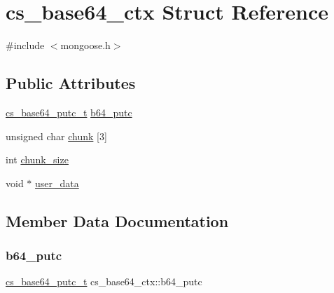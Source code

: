 \hypertarget{structcs__base64__ctx}{}\section{cs\+\_\+base64\+\_\+ctx Struct Reference}
\label{structcs__base64__ctx}


{\ttfamily \#include $<$mongoose.\+h$>$}

\subsection*{Public Attributes}
\begin{DoxyCompactItemize}
\item 
\hyperlink{mongoose_8h_ab2260ef7657f28e31f29dcc1313f1e8d_ab2260ef7657f28e31f29dcc1313f1e8d}{cs\+\_\+base64\+\_\+putc\+\_\+t} \hyperlink{structcs__base64__ctx_a59b8384fbdd1681555a9dd18ed6585ae_a59b8384fbdd1681555a9dd18ed6585ae}{b64\+\_\+putc}
\item 
unsigned char \hyperlink{structcs__base64__ctx_a209b5eff716d6a1850cca128ed5b070e_a209b5eff716d6a1850cca128ed5b070e}{chunk} \mbox{[}3\mbox{]}
\item 
int \hyperlink{structcs__base64__ctx_a5753baf57fe83161369e2270d57e4a9e_a5753baf57fe83161369e2270d57e4a9e}{chunk\+\_\+size}
\item 
void $\ast$ \hyperlink{structcs__base64__ctx_ac6023cc2887001835a99b6a71db9f43b_ac6023cc2887001835a99b6a71db9f43b}{user\+\_\+data}
\end{DoxyCompactItemize}


\subsection{Member Data Documentation}
\mbox{\label{structcs__base64__ctx_a59b8384fbdd1681555a9dd18ed6585ae_a59b8384fbdd1681555a9dd18ed6585ae}} 
\subsubsection{\texorpdfstring{b64\+\_\+putc}{b64\_putc}}
{\footnotesize\ttfamily \hyperlink{mongoose_8h_ab2260ef7657f28e31f29dcc1313f1e8d_ab2260ef7657f28e31f29dcc1313f1e8d}{cs\+\_\+base64\+\_\+putc\+\_\+t} cs\+\_\+base64\+\_\+ctx\+::b64\+\_\+putc}



